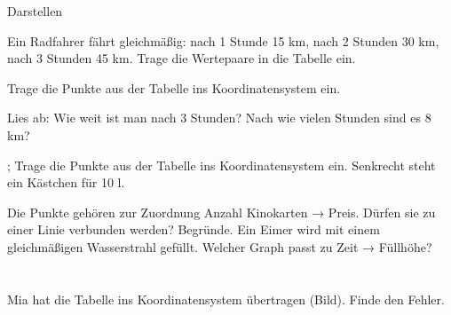 \setcounter{aufgabe}{7}

\begin{aufgabe}{Darstellen}
\begin{teile}
\teil Ein Radfahrer fährt gleichmäßig: nach 1 Stunde 15 km, nach 2 Stunden 30 km, nach 3 Stunden 45 km. Trage die Wertepaare in die Tabelle ein.

\teil Trage die Punkte aus der Tabelle ins Koordinatensystem ein.

 \begin{ksys}[xmin=0,xmax=5,ymin=0,ymax=9,xlabel=Zeit in h,ylabel=Weg in km]\end{ksys}
\teil Lies ab: Wie weit ist man nach 3 Stunden? Nach wie vielen Stunden sind es 8 km?

\begin{ksys}[xmin=0,xmax=5,ymin=0,ymax=10,ablesen,xlabel=Zeit in h,ylabel=Weg in km]\end{ksys}
\leerfeld[km] ; \leerfeld[h]
\teil Trage die Punkte aus der Tabelle ins Koordinatensystem ein. Senkrecht steht ein Kästchen für 10 l.

 \begin{ksys}[xmin=0,xmax=5,ymin=0,ymax=100,ystep=10,xlabel=Zeit in min,ylabel=Wasser in l]\end{ksys}
\teil Die Punkte gehören zur Zuordnung Anzahl Kinokarten → Preis. Dürfen sie zu einer Linie verbunden werden? Begründe.
\teil Ein Eimer wird mit einem gleichmäßigen Wasserstrahl gefüllt. Welcher Graph passt zu Zeit → Füllhöhe? \\  \\  \\ 
\teil Mia hat die Tabelle ins Koordinatensystem übertragen (Bild). Finde den Fehler.


\end{teile}
\end{aufgabe}
